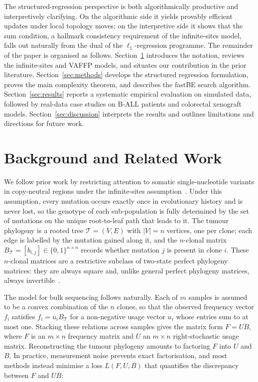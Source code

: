 \documentclass[11pt]{article}
\begin{document}
The structured-regression perspective is both algorithmically productive and interpretively clarifying. On the algorithmic side it yields provably efficient updates under local topology moves; on the interpretive side it shows that the sum condition, a hallmark consistency requirement of the infinite-sites model, falls out naturally from the dual of the $\ell_1$-regression programme. The remainder of the paper is organised as follows. Section~\ref{sec:background} introduces the notation, reviews the infinite-sites and VAFFP models, and situates our contribution in the prior literature. Section~\ref{sec:methods} develops the structured regression formulation, proves the main complexity theorem, and describes the fastBE search algorithm. Section~\ref{sec:results} reports a systematic empirical evaluation on simulated data, followed by real-data case studies on B-ALL patients and colorectal xenograft models. Section~\ref{sec:discussion} interprets the results and outlines limitations and directions for future work.

\section{Background and Related Work}
\label{sec:background}

We follow prior work by restricting attention to somatic single-nucleotide variants in copy-neutral regions under the infinite-sites assumption~\citep{elkebir2015reconstruction,deshwar2015phylowgs,popic2015lichee,malikic2015citup,roth2014pyclone,satas2017pastri,myers2019calder,wintersinger2022pairtree}. Under this assumption, every mutation occurs exactly once in evolutionary history and is never lost, so the genotype of each sub-population is fully determined by the set of mutations on the unique root-to-leaf path that leads to it. The tumour phylogeny is a rooted tree $\mathcal{T}=(V,E)$ with $|V|=n$ vertices, one per clone; each edge is labelled by the mutation gained along it, and the $n$-clonal matrix $B_{\mathcal{T}}=[b_{i,j}]\in\{0,1\}^{n\times n}$ records whether mutation $j$ is present in clone $i$. These $n$-clonal matrices are a restrictive subclass of two-state perfect phylogeny matrices: they are always square and, unlike general perfect phylogeny matrices, always invertible~\citep{elkebir2015reconstruction}.

The model for bulk sequencing follows naturally. Each of $m$ samples is assumed to be a convex combination of the $n$ clones, so that the observed frequency vector $f_i$ satisfies $f_i = u_i B_{\mathcal{T}}$ for a non-negative usage vector $u_i$ whose entries sum to at most one. Stacking these relations across samples gives the matrix form $F = U B$, where $F$ is an $m\times n$ frequency matrix and $U$ an $m\times n$ right-stochastic usage matrix. Reconstructing the tumour phylogeny amounts to factoring $F$ into $U$ and $B$. In practice, measurement noise prevents exact factorisation, and most methods instead minimise a loss $L(F, U, B)$ that quantifies the discrepancy between $F$ and $UB$:
\end{document}

